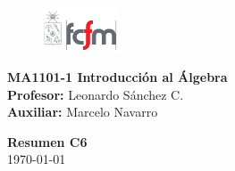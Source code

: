 \documentclass[letterpaper,10pt]{article}
\theoremstyle{plain}
\begin{document}
\newpage
\pagestyle{fancy}
\fancyhf{}

\begin{figure} %
    \vspace{-5mm}
    \includegraphics[width=0.2\textwidth]{img/fcfm2.png}
\end{figure}


\noindent
\textbf{MA1101-1 Introducción al Álgebra}\\
\textbf{Profesor: }Leonardo Sánchez C.\\
\textbf{Auxiliar: }Marcelo Navarro

\begin{center}
{\bf \Large Resumen C6}\\
{\today}
\end{center}
\end{document}
